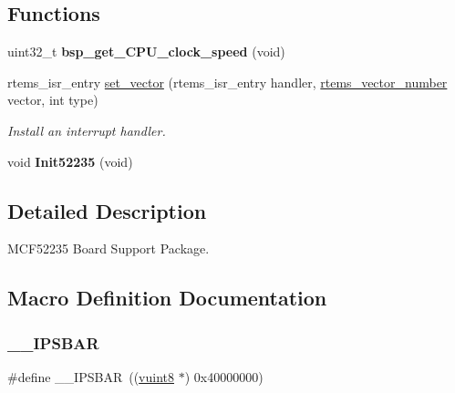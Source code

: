 \subsection*{Functions}
\begin{DoxyCompactItemize}
\item 
\mbox{\label{group__RTEMSBSPsM68kMCF52235_gaf40918e55ef318de160e2e3174ba5562}} 
uint32\+\_\+t {\bfseries bsp\+\_\+get\+\_\+\+C\+P\+U\+\_\+clock\+\_\+speed} (void)
\item 
rtems\+\_\+isr\+\_\+entry \mbox{\hyperlink{group__RTEMSBSPsM68kMCF52235_gab3388042c56b34c40be81fd5f028d97e}{set\+\_\+vector}} (rtems\+\_\+isr\+\_\+entry handler, \mbox{\hyperlink{group__ClassicINTR_ga3e434c197d99f128e78cae4d9358bd8b}{rtems\+\_\+vector\+\_\+number}} vector, int type)
\begin{DoxyCompactList}\small\item\em Install an interrupt handler. \end{DoxyCompactList}\item 
\mbox{\label{group__RTEMSBSPsM68kMCF52235_gaaaa1dceb8aedec9c7b8c57bc43ac7300}} 
void {\bfseries Init52235} (void)
\end{DoxyCompactItemize}


\subsection{Detailed Description}
M\+C\+F52235 Board Support Package. 



\subsection{Macro Definition Documentation}
\mbox{\label{group__RTEMSBSPsM68kMCF52235_gabdb86768904e30373b5aa4cf02a915b6}} 
\subsubsection{\texorpdfstring{\_\_IPSBAR}{\_\_IPSBAR}}
{\footnotesize\ttfamily \#define \+\_\+\+\_\+\+I\+P\+S\+B\+AR~((\mbox{\hyperlink{group__RTEMSBSPsM68kMCF5329_gab2208c2cec6d83509a16c4b4e177bc20}{vuint8}} $\ast$) 0x40000000)}

